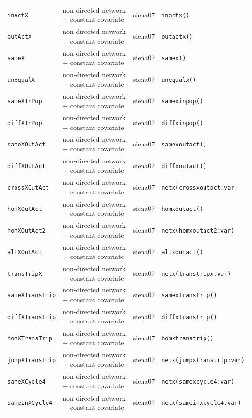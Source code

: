 \begin{longtable}{@{}p{2.6cm}p{3.2cm}p{2.9cm}p{5.4cm}@{}}
\texttt{inActX} & non-directed network + constant covariate & siena07 & \texttt{inactx()}\\
\texttt{outActX} & non-directed network + constant covariate & siena07 & \texttt{outactx()}\\
\texttt{sameX} & non-directed network + constant covariate & siena07 & \texttt{samex()}\\
\texttt{unequalX} & non-directed network + constant covariate & siena07 & \texttt{unequalx()}\\
\texttt{sameXInPop} & non-directed network + constant covariate & siena07 & \texttt{samexinpop()}\\
\texttt{diffXInPop} & non-directed network + constant covariate & siena07 & \texttt{diffxinpop()}\\
\texttt{sameXOutAct} & non-directed network + constant covariate & siena07 & \texttt{samexoutact()}\\
\texttt{diffXOutAct} & non-directed network + constant covariate & siena07 & \texttt{diffxoutact()}\\
\texttt{crossXOutAct} & non-directed network + constant covariate & siena07 & \texttt{netx(crossxoutact:var)}\\
\texttt{homXOutAct} & non-directed network + constant covariate & siena07 & \texttt{homxoutact()}\\
\texttt{homXOutAct2} & non-directed network + constant covariate & siena07 & \texttt{netx(homxoutact2:var)}\\
\texttt{altXOutAct} & non-directed network + constant covariate & siena07 & \texttt{altxoutact()}\\
\texttt{transTripX} & non-directed network + constant covariate & siena07 & \texttt{netx(transtripx:var)}\\
\texttt{sameXTransTrip} & non-directed network + constant covariate & siena07 & \texttt{samextranstrip()}\\
\texttt{diffXTransTrip} & non-directed network + constant covariate & siena07 & \texttt{diffxtranstrip()}\\
\texttt{homXTransTrip} & non-directed network + constant covariate & siena07 & \texttt{homxtranstrip()}\\
\texttt{jumpXTransTrip} & non-directed network + constant covariate & siena07 & \texttt{netx(jumpxtranstrip:var)}\\
\texttt{sameXCycle4} & non-directed network + constant covariate & siena07 & \texttt{netx(samexcycle4:var)}\\
\texttt{sameInXCycle4} & non-directed network + constant covariate & siena07 & \texttt{netx(sameinxcycle4:var)}\\

\end{longtable}
